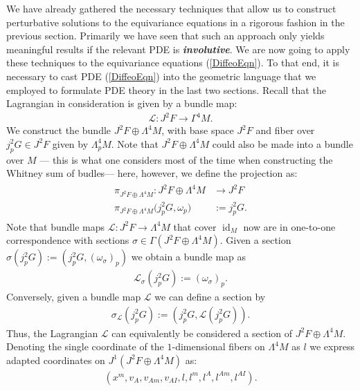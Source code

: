 We have already gathered the necessary techniques that allow us to construct perturbative solutions to the equivariance equations in a rigorous fashion in the previous section. Primarily we have seen that such an approach only yields meaningful results if the relevant PDE is \textit{\textbf{involutive}}. We are now going to apply these techniques to the equivariance equations (\ref{DiffeoEqn}). To that end, it is necessary to cast PDE (\ref{DiffeoEqn}) into the geometric language that we employed to formulate PDE theory in the last two sections. Recall that the Lagrangian in consideration is given by a bundle map:
\begin{align}
\mathcal{L} : J^2F \longrightarrow \Gamma^4M.
\end{align}
We construct the bundle $J^2F \oplus \Lambda^4M$, with base space $J^2F$ and fiber over $j^2_pG \in J^2F$ given by $\Lambda^4_pM$. Note that $J^2F \oplus \Lambda^4M$ could also be made into a bundle over $M$ --- this is what one considers most of the time when constructing the Whitney sum of budles--- here, however, we define the projection as:
\begin{align}
    \begin{aligned}
     \pi_{J^2F \oplus \Lambda^4M} : J^2F \oplus \Lambda^4M &\longrightarrow J^2F \\
    \pi_{J^2F \oplus \Lambda^4M} \bigl (j^2_pG,\omega_p \bigr) &:= j^2_pG.
    \end{aligned}
\end{align}
Note that bundle maps $\mathcal{L} : J^2F \rightarrow \Lambda^4M$ that cover $\operatorname{id}_M$ now are in one-to-one correspondence with sections $\sigma \in \Gamma(J^2F \oplus \Lambda^4M)$.
Given a section $\sigma(j^2_pG):=(j^2_pG,(\omega_{\sigma})_p)$ we obtain a bundle map as 
\begin{align}\mathcal{L}_{\sigma} (j^2_pG) := (\omega_{\sigma})_p.
\end{align}
Conversely, given a bundle map $\mathcal{L}$ we can define a section by 
\begin{align}
\sigma_{\mathcal{L}}(j^2_pG) := (j^2_pG, \mathcal{L}(j^2_pG)).
\end{align}
Thus, the Lagrangian $\mathcal{L}$ can equivalently be considered a section of $J^2F\oplus \Lambda^4M$. 
Denoting the single coordinate of the $1$-dimensional fibers on $\Lambda^4M$ as $l$ we express adapted coordinates on $J^1(J^2F \oplus \Lambda^4M)$ as:
\begin{align}
(x^m,v_A,v_{Am},v_{AI},l,l^{m},l^{A},l^{Am},l^{AI}).
\end{align}
